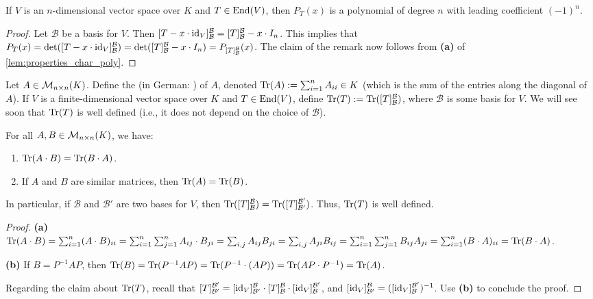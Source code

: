 \begin{remark}\label{rem:char_poly_degree}
  If $V$ is an $n$-di\-men\-sional vector space over $K$ and $T \in \operatorname{End}(V)$, then $P_T(x)$ is a polynomial of degree $n$ with leading coefficient $(-1)^n$.
\end{remark}
\begin{proof}
  Let $\mathcal{B}$ be a basis for $V$. Then $[T - x \cdot \operatorname{id}_V]_{\mathcal{B}}^{\mathcal{B}} = [T]_{\mathcal{B}}^{\mathcal{B}} - x \cdot I_n$. This implies that $P_T(x) = \det([T - x \cdot \operatorname{id}_V]_{\mathcal{B}}^{\mathcal{B}}) = \det([T]_{\mathcal{B}}^{\mathcal{B}} - x \cdot I_n) = P_{[T]_{\mathcal{B}}^{\mathcal{B}}}(x)$. The claim of the remark now follows from \textbf{(a)} of \cref{lem:properties_char_poly}.
\end{proof}

\begin{definition}[Trace]\label{def:trace}
  Let $A \in \mathcal{M}_{n \times n}(K)$. Define the  (in German: ) of $A$, denoted $\operatorname{Tr}(A) := \sum_{i=1}^n A_{ii} \in K$ (which is the sum of the entries along the diagonal of $A$).
  If $V$ is a finite-dimensional vector space over $K$ and $T \in \operatorname{End}(V)$, define $\operatorname{Tr}(T) := \operatorname{Tr}([T]_{\mathcal{B}}^{\mathcal{B}})$, where $\mathcal{B}$ is some basis for $V$. We will see soon that $\operatorname{Tr}(T)$ is well defined (i.e., it does not depend on the choice of $\mathcal{B}$).
\end{definition}

\begin{lemma}\label{lem:properties_trace}
  For all $A, B \in \mathcal{M}_{n \times n}(K)$, we have:
  \begin{enumerate}[label=\textbf{(\alph*)}]
    \item $\operatorname{Tr}(A \cdot B) = \operatorname{Tr}(B \cdot A)$.
    \item If $A$ and $B$ are similar matrices, then $\operatorname{Tr}(A) = \operatorname{Tr}(B)$.
  \end{enumerate}
  In particular, if $\mathcal{B}$ and $\mathcal{B}'$ are two bases for $V$, then $\operatorname{Tr}([T]_{\mathcal{B}}^{\mathcal{B}}) = \operatorname{Tr}([T]_{\mathcal{B}'}^{\mathcal{B}'})$. Thus, $\operatorname{Tr}(T)$ is well defined.
\end{lemma}

\begin{proof}
  \textbf{(a)} $\operatorname{Tr}(A \cdot B) = \sum_{i=1}^n (A \cdot B)_{ii} = \sum_{i=1}^n \sum_{j=1}^n A_{ij} \cdot B_{ji} = \sum_{i,j} A_{ij}B_{ji} = \sum_{i,j} A_{ji}B_{ij} = \sum_{i=1}^n \sum_{j=1}^n B_{ij}A_{ji} = \sum_{i=1}^n (B \cdot A)_{ii} = \operatorname{Tr}(B \cdot A)$.

  \textbf{(b)} If $B = P^{-1}AP$, then $\operatorname{Tr}(B) = \operatorname{Tr}(P^{-1}AP) = \operatorname{Tr}(P^{-1} \cdot (AP)) = \operatorname{Tr}(AP \cdot P^{-1}) = \operatorname{Tr}(A)$.

  Regarding the claim about $\operatorname{Tr}(T)$, recall that $[T]_{\mathcal{B}'}^{\mathcal{B}'} = [\operatorname{id}_V]_{\mathcal{B}'}^{\mathcal{B}} \cdot [T]_{\mathcal{B}}^{\mathcal{B}} \cdot [\operatorname{id}_V]_{\mathcal{B}}^{\mathcal{B}'}$, and $[\operatorname{id}_V]_{\mathcal{B}'}^{\mathcal{B}} = ([\operatorname{id}_V]_{\mathcal{B}}^{\mathcal{B}'})^{-1}$. Use \textbf{(b)} to conclude the proof.
\end{proof}

